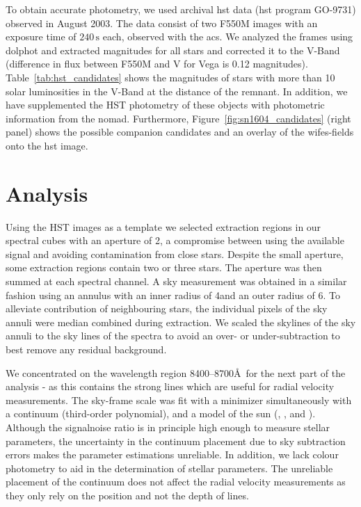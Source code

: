 \documentclass[preprint2]{aastex}
\begin{document}
To obtain accurate photometry, we used archival \gls{hst} data (\gls{hst} program GO-9731) observed in August 2003. The data consist of two F550M images with an exposure time of $240\,\textrm{s}$ each, observed with the \gls{acs}. We analyzed the frames using \gls{dolphot} and extracted magnitudes for all stars and corrected it to the V-Band (difference in flux between F550M and V for Vega is 0.12 magnitudes). Table~\ref{tab:hst_candidates} shows the magnitudes of stars with more than 10 solar luminosities in the V-Band at the distance of the remnant. In addition, we have supplemented the HST photometry of these objects with photometric information from the \gls{nomad}. Furthermore, Figure~\ref{fig:sn1604_candidates}  (right panel) shows the possible companion candidates and an overlay of the \gls{wifes}-fields onto the \gls{hst} image. 







\section{Analysis}
\label{sec:analysis}
 

Using the HST images as a template we selected extraction regions in our spectral cubes with an aperture of 2\arcsec, a compromise between using the available signal and avoiding contamination from close stars. Despite the small aperture, some extraction regions contain two or three stars. The aperture was then summed at each spectral channel. A sky measurement was obtained in a similar fashion using an annulus with an inner radius of 4\arcsec and an outer radius of 6\arcsec. To alleviate contribution of neighbouring stars,  the individual pixels of the sky annuli were median combined during extraction. We scaled the skylines of the sky annuli to the sky lines of the spectra to avoid an over- or under-subtraction to best remove any residual background.

We concentrated on the wavelength region 8400--8700\AA\ for the next part of the analysis - as this contains the strong  lines which are useful for radial velocity measurements. The sky-frame scale was fit with a minimizer \citep{powell1964efficient} simultaneously with a continuum (third-order polynomial), and a model of the sun (, , and ). Although the \gls{signalnoise} ratio is in principle high enough to measure stellar parameters, the uncertainty in the continuum placement due to sky
subtraction errors makes the parameter estimations unreliable. In addition, we lack colour photometry to aid in the determination of stellar parameters. The unreliable placement of the continuum does not affect the radial velocity measurements as they only rely on the position and not the depth of lines.
\end{document}
